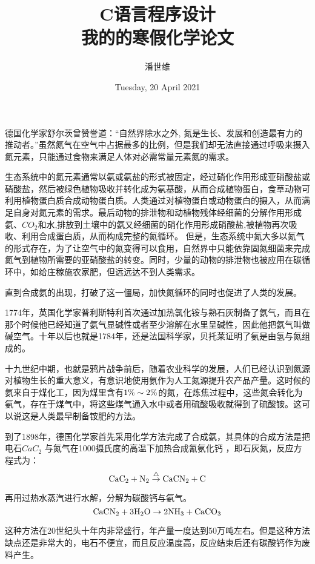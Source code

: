 \documentclass[a4paper,12pt]{article}
\begin{document}
\title {C语言程序设计\\我的的寒假化学论文}
\author{潘世维}
\date{Tuesday, 20 April 2021}
    
\maketitle
 



德国化学家舒尔茨曾赞誉道：“自然界除水之外, 氮是生长、发展和创造最有力的推动者。”虽然氮气在空气中占据最多的比例，但是我们却无法直接通过呼吸来摄入氮元素，只能通过食物来满足人体对必需常量元素氮的需求。

生态系统中的氮元素通常以氨或氨盐的形式被固定，经过硝化作用形成亚硝酸盐或硝酸盐，然后被绿色植物吸收并转化成为氨基酸，从而合成植物蛋白，食草动物可利用植物蛋白质合成动物蛋白质。人类通过对植物蛋白或动物蛋白的摄入，从而满足自身对氮元素的需求。最后动物的排泄物和动植物残体经细菌的分解作用形成氨、$CO_2$和水,排放到土壤中的氨又经细菌的硝化作用形成硝酸盐,被植物再次吸收、利用合成蛋白质，从而构成完整的氮循环。 但是，生态系统中氮大多以氮气的形式存在，为了让空气中的氮变得可以食用，自然界中只能依靠固氮细菌来完成氮气到植物所需要的亚硝酸盐的转变。同时，少量的动物的排泄物也被应用在碳循环中，如给庄稼施农家肥，但远远达不到人类需求。

直到合成氨的出现，打破了这一僵局，加快氮循环的同时也促进了人类的发展。

1774年，英国化学家普利斯特利首次通过加热氯化铵与熟石灰制备了氨气，而且在那个时候他已经知道了氨气显碱性或者至少溶解在水里呈碱性，因此他把氨气叫做碱空气。十年以后也就是1784年，还是法国科学家，贝托莱证明了氨是由氢与氮组成的。

十九世纪中期，也就是鸦片战争前后，随着农业科学的发展，人们已经认识到氮源对植物生长的重大意义，有意识地使用氨作为人工氮源提升农产品产量。这时候的氨来自于煤化工，因为煤里含有$\rm 1\%\sim2\%$的氮，在炼焦过程中，这些氮会转化为氨气，存在于煤气中，将这些煤气通入水中或者用硫酸吸收就得到了硫酸铵。这可以说这是人类最早制备铵肥的方法。

到了1898年，德国化学家首先采用化学方法完成了合成氨，其具体的合成方法是把电石$CaC_2$ 与氮气在1000摄氏度的高温下加热合成氰氨化钙  ，即石灰氮，反应方程式为：
$$
\rm CaC_2 + N_2\overset{\triangle }{\rightarrow}  CaCN_2 + C
$$

再用过热水蒸汽进行水解，分解为碳酸钙与氨气。
$$
\rm CaCN_2+3H_2O \rightarrow2NH_3+CaCO_3
$$

这种方法在20世纪头十年内非常盛行，年产量一度达到50万吨左右。但是这种方法缺点还是非常大的，电石不便宜，而且反应温度高，反应结束后还有碳酸钙作为废料产生。
\end{document}
